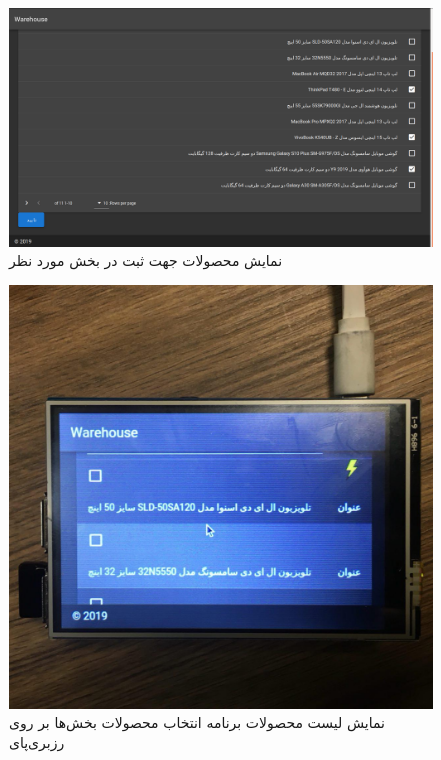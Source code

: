 \begin{figure}[t!]
    \centering
    \includegraphics[scale=0.25]{figures/segment.png}
    \caption{نمایش محصولات جهت ثبت در بخش مورد نظر }
    \label{segment}
\end{figure}

\begin{figure}[t!]
    \centering
    \includegraphics[scale=0.25]{figures/implement.jpg}
    \caption{نمایش لیست محصولات برنامه انتخاب محصولات بخش‌ها بر روی رزبری‌پای}
    \label{implement}
\end{figure}


